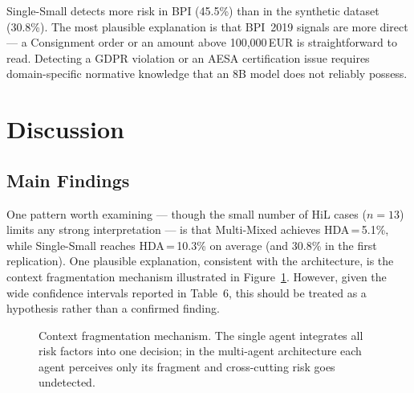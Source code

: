 \documentclass[preprint,12pt,numrefs]{elsarticle}
\begin{document}
Single-Small detects more risk in BPI (45.5\%) than in the synthetic
dataset (30.8\%). The most plausible explanation is that BPI~2019
signals are more direct --- a Consignment order or an amount above
100,000\,EUR is straightforward to read. Detecting a GDPR violation
or an AESA certification issue requires domain-specific normative
knowledge that an 8B model does not reliably possess.

\section{Discussion}
\label{sec:discussion}

\subsection{Main Findings}

One pattern worth examining --- though the small number of HiL 
cases ($n=13$) limits any strong interpretation --- is that 
Multi-Mixed achieves HDA\,=\,5.1\%, while Single-Small reaches 
HDA\,=\,10.3\% on average (and 30.8\% in the first replication). 
One plausible explanation, consistent with the architecture, 
is the context fragmentation mechanism illustrated in 
Figure~\ref{fig:fragmentacion}. However, given the wide 
confidence intervals reported in Table~6, this should be 
treated as a hypothesis rather than a confirmed finding.

\begin{figure}[H]
\centering
{}
\caption{Context fragmentation mechanism. The single agent integrates
         all risk factors into one decision; in the multi-agent
         architecture each agent perceives only its fragment and
         cross-cutting risk goes undetected.}
\label{fig:fragmentacion}
\end{figure}
\end{document}

